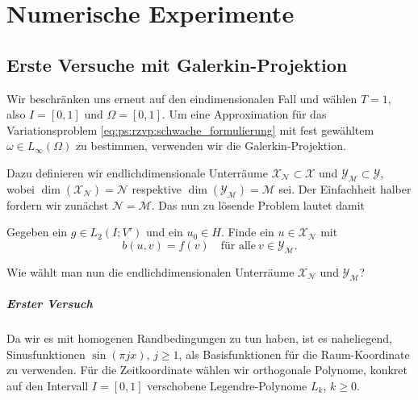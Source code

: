 
\chapter{Numerische Experimente} %
\label{cha:numerische_experimente}


\section{Erste Versuche mit Galerkin-Projektion} %
\label{sec:erste_versuche_mit_galerkin_projektion}

Wir beschränken uns erneut auf den eindimensionalen Fall und wählen $T = 1$, also $I = [0, 1]$ und $\Omega = [0 ,1]$.
Um eine Approximation für das Variationsproblem \eqref{eq:ps:rzvp:schwache_formulierung} mit fest gewähltem $\omega \in L_{\infty}(\Omega)$ zu bestimmen, verwenden wir die Galerkin-Projektion.

Dazu definieren wir endlichdimensionale Unterräume $\mathcal X_{\mathcal N} \subset \mathcal X$ und $\mathcal Y_{\mathcal M} \subset \mathcal Y$, wobei $\dim(\mathcal X_{\mathcal N}) = \mathcal N$ respektive $\dim(\mathcal Y_{\mathcal M}) = \mathcal M$ sei.
Der Einfachheit halber fordern wir zunächst $\mathcal N = \mathcal M$.
Das nun zu lösende Problem lautet damit

\begin{Problem}
    Gegeben ein $g \in L_{2}(I; V')$ und ein $u_{0} \in H$. Finde ein $u \in \mathcal X_{\mathcal N}$ mit
    \begin{equation}
        \label{eq:ps:rzvp:schwache_formulierung_3}
        b(u, v) = f(v) \quad \text{für alle}~v \in \mathcal Y_{\mathcal M}.
    \end{equation}
\end{Problem}

Wie wählt man nun die endlichdimensionalen Unterräume $\mathcal X_{\mathcal N}$ und $\mathcal Y_{\mathcal M}$?

\paragraph{Erster Versuch} %
\label{par:erster_versuch}

Da wir es mit homogenen Randbedingungen zu tun haben, ist es naheliegend, Sinusfunktionen $\sin(\pi j x)$, $j \geq 1$, als Basisfunktionen für die Raum-Koordinate zu verwenden.
Für die Zeitkoordinate wählen wir orthogonale Polynome, konkret auf den Intervall $I = [0, 1]$ verschobene Legendre-Polynome $L_{k}$, $k \geq 0$.

